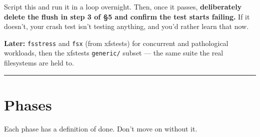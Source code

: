 Script this and run it in a loop overnight. Then, once it passes, \textbf{deliberately delete
the flush in step 3 of §5 and confirm the test starts failing.} If it doesn't, your crash
test isn't testing anything, and you'd rather learn that now.

\textbf{Later:} \texttt{fsstress} and \texttt{fsx} (from xfstests) for concurrent and pathological
workloads, then the xfstests \texttt{generic/} subset --- the same suite the real filesystems are
held to.

\begin{center}\rule{0.5\linewidth}{0.5pt}\end{center}

\hypertarget{phases}{%
\section{Phases}\label{phases}}

Each phase has a definition of done. Don't move on without it.

